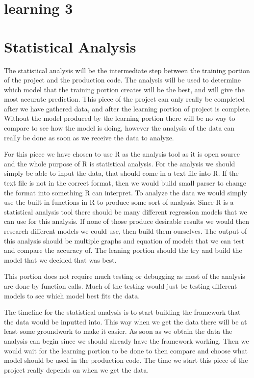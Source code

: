 \documentclass[10pt, draftclsnofoot, onecolumn]{IEEEtran}
\begin{document}
\section{learning 3}
\section{Statistical Analysis}
The statistical analysis will be the intermediate step between the training portion of the project and the production code. The analysis will be used to determine which model that the training portion creates will be the best, and will give the most accurate prediction. This piece of the project can only really be completed after we have gathered data, and after the learning portion of project is complete. Without the model produced by the learning portion there will be no way to compare to see how the model is doing, however the analysis of the data can really be done as soon as we receive the data to analyze.

For this piece we have chosen to use R as the analysis tool as it is open source and the whole purpose of R is statistical analysis. For the analysis we should simply be able to input the data, that should come in a text file into R. If the text file is not in the correct format, then we would build small parser to change the format into something R can interpret. To analyze the data we would simply use the built in functions in R to produce some sort of analysis. Since R is a statistical analysis tool there should be many different regression models that we can use for this analysis. If none of those produce desirable results we would then research different models we could use, then build them ourselves. The output of this analysis should be multiple graphs and equation of models that we can test and compare the accuracy of. The leaning portion should the try and build the model that we decided that was best.

This portion does not require much testing or debugging as most of the analysis are done by function calls. Much of the testing would just be testing different models to see which model best fits the data.

The timeline for the statistical analysis is to start building the framework that the data would be inputted into. This way when we get the data there will be at least some groundwork to make it easier. As soon as we obtain the data the analysis can begin since we should already have the framework working. Then we would wait for the learning portion to be done to then compare and choose what model should be used in the production code. The time we start this piece of the project really depends on when we get the data.
\end{document}

